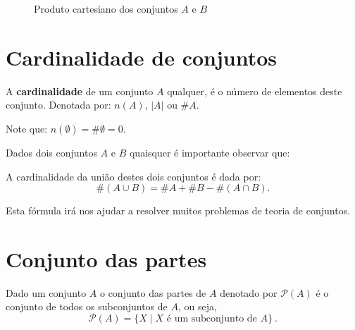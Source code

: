 \begin{exem}
  \begin{figure}[H]
 \centering
    \caption{Produto cartesiano dos conjuntos $A$ e $B$}
  \end{figure}

 \end{exem}

\section{Cardinalidade de conjuntos}

 A \textbf{cardinalidade} de um conjunto $A$ qualquer, é o número de elementos deste conjunto. Denotada por: $n(A)$, $|A|$ ou $\# A$.

 Note que: $n(\emptyset)= \# \emptyset= 0$.

 Dados dois conjuntos $A$ e $B$ quaisquer é importante observar que:
 \vskip0.3cm
 \colorbox{azul}{
 \begin{minipage}{0.9\linewidth}
 \begin{center}
 A cardinalidade da união destes dois conjuntos é dada por:
\begin{equation}
\#(A \cup B)= \# A + \# B - \#(A \cap B) .
\end{equation}
 \end{center}
 \end{minipage}}
 \vskip0.3cm

 Esta fórmula irá nos ajudar a resolver muitos problemas de teoria de conjuntos.

 \section{Conjunto das partes}

 Dado um conjunto $A$ o conjunto das partes de $A$ denotado por $\mathcal{P}(A)$ é o conjunto de todos os subconjuntos de $A$, ou seja,
\begin{equation}
\mathcal{P}(A)= \{X \mid X \text{ é um subconjunto de } A\} \ .
\end{equation}

